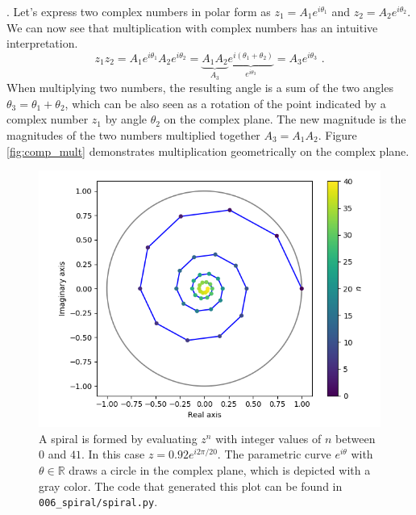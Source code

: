 . Let's express two complex numbers in polar form as $z_1=A_1e^{i\theta_1}$ and $z_2=A_2e^{i\theta_2}$. We can now see that multiplication with complex numbers has an intuitive interpretation.
\begin{equation}
  z_1 z_2 = A_1 e^{i\theta_1} A_2 e^{i\theta_2} = \underbrace{A_1
    A_2}_{A_3} \underbrace{e^{i(\theta_1 + \theta_2)}}_{e^{i\theta_3}} =
  A_3 e^{i\theta_3} \,\,.
\end{equation}
When multiplying two numbers, the resulting angle is a sum of the two angles $\theta_3=\theta_1 + \theta_2$, which can be also seen as a rotation of the point indicated by a complex number $z_1$ by angle $\theta_2$ on the complex plane. The new magnitude is the magnitudes of the two numbers multiplied together $A_3=A_1A_2$. Figure \ref{fig:comp_mult} demonstrates multiplication geometrically on the complex plane.

\begin{figure}
  \begin{center}
    \includegraphics[width=\textwidth]{code/006_spiral/spiral.png}
  \end{center}
  \caption{A spiral is formed by evaluating $z^n$ with integer values of $n$ between $0$ and $41$. In this case $z = 0.92 e^{i 2\pi /20}$. The parametric curve $e^{i\theta}$ with $\theta \in \mathbb{R}$ draws a circle in the complex plane, which is depicted with a gray color. The code that generated this plot can be found in \texttt{006\_spiral/spiral.py}.}
  \label{fig:spirals}
\end{figure}

